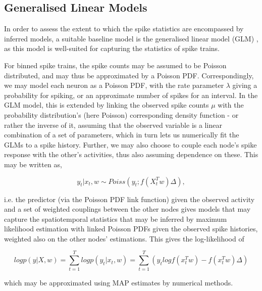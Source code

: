 \documentclass[mphil,deptreport,ianc]{infthesis} %
\begin{document}
\subsection{Generalised Linear Models}\label{subsect:GLMs}

In order to assess the extent to which the spike statistics are encompassed by inferred models, a suitable baseline model is the generalised linear model (GLM) \cite{Nelder1972, Fernandez2000}, as this model is well-suited for capturing the statistics of spike trains.

For binned spike trains, the spike counts may be assumed to be Poisson distributed, and may thus be approximated by a Poisson PDF.
Correspondingly, we may model each neuron as a Poisson PDF, with the rate parameter $\lambda$ giving a probability for spiking, or an approximate number of spikes for an interval.
In the GLM model, this is extended by linking the observed spike counts $\mu$ with the probability distribution's (here Poisson) corresponding density function - or rather the inverse of it, assuming that the observed variable is a linear combination of a set of parameters, which in turn lets us numerically fit the GLMs to a spike history.
Further, we may also choose to couple each node's spike response with the other's activities, thus also assuming dependence on these. This may be written as,

\begin{equation}
    y_t|x_t, w \sim Poiss(y_t; f(X_t^T w)\Delta),
\end{equation}

i.e. the predictor (via the Poisson PDF link function) given the observed activity and a set of weighted couplings between the other nodes gives models that may capture the spatiotemporal statistics that may be inferred by maximum likelihood estimation with linked Poisson PDFs given the observed spike histories, weighted also on the other nodes' estimations.
This gives the log-likelihood of

\begin{equation}
    log p(y|X, w) = \sum_{t=1}^T log p(y_t| x_t, w) = \sum_{t=1}^T(y_t log f(x_t^Tw) - f(x_t^Tw)\Delta)
\end{equation}

which may be approximated using MAP estimates by numerical methods.

\end{document}
